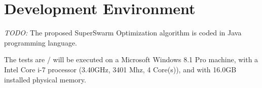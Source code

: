 \section{Development Environment}

\emph{\color{red}TODO:} 
The proposed SuperSwarm Optimization algorithm is coded in Java programming language.  

The tests are / will be executed on a Microsoft Windows 8.1 Pro machine, with a Intel Core i-7 processor (3.40GHz, 3401 Mhz, 4 Core(s)), and with 16.0GB installed physical memory. 

